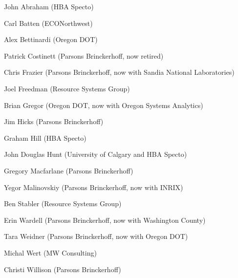 \begin{description}\itemsep-3.5pt
\item \hspace{0.4in}John Abraham (HBA Specto)
\item \hspace{0.4in}Carl Batten (ECONorthwest)
\item \hspace{0.4in}Alex Bettinardi (Oregon DOT)
\item \hspace{0.4in}Patrick Costinett (Parsons Brinckerhoff, now retired)
\item \hspace{0.4in}Chris Frazier (Parsons Brinckerhoff, now with Sandia National Laboratories) 
\item \hspace{0.4in}Joel Freedman (Resource Systems Group)
\item \hspace{0.4in}Brian Gregor (Oregon DOT, now with Oregon Systems Analytics)
\item \hspace{0.4in}Jim Hicks (Parsons Brinckerhoff)
\item \hspace{0.4in}Graham Hill (HBA Specto)
\item \hspace{0.4in}John Douglas Hunt (University of Calgary and HBA Specto)
\item \hspace{0.4in}Gregory Macfarlane (Parsons Brinckerhoff)
\item \hspace{0.4in}Yegor Malinovskiy (Parsons Brinckerhoff, now with INRIX)
\item \hspace{0.4in}Ben Stabler (Resource Systems Group)
\item \hspace{0.4in}Erin Wardell (Parsons Brinckerhoff, now with Washington County)
\item \hspace{0.4in}Tara Weidner (Parsons Brinckerhoff, now with Oregon DOT)
\item \hspace{0.4in}Michal Wert (MW Consulting)
\item \hspace{0.4in}Christi Willison (Parsons Brinckerhoff)
\end{description}

